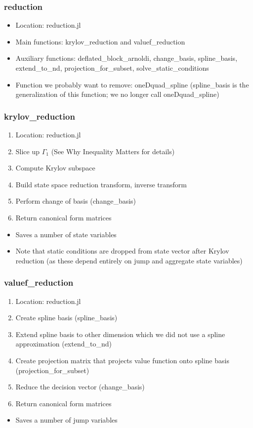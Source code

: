 \documentclass{beamer}
\begin{document}
\begin{frame}
  \frametitle{reduction}
\begin{itemize}
\item Location: reduction.jl
\item Main functions: krylov\_reduction and valuef\_reduction
\item Auxiliary functions: deflated\_block\_arnoldi, change\_basis, spline\_basis, extend\_to\_nd, projection\_for\_subset, solve\_static\_conditions
\item Function we probably want to remove: oneDquad\_spline (spline\_basis is the generalization of this function; we no longer call oneDquad\_spline)
\end{itemize}
\end{frame}
\begin{frame}
\frametitle{krylov\_reduction}
\begin{enumerate}
\item Location: reduction.jl
\item Slice up $\Gamma_1$ (See Why Inequality Matters for details)
\item Compute Krylov subspace
\item Build state space reduction transform, inverse transform
\item Perform change of basis (change\_basis)
\item Return canonical form matrices
\end{enumerate}
\begin{itemize}
\item Saves a number of state variables
\item Note that static conditions are dropped from state vector after Krylov reduction (as these depend entirely on jump and aggregate state variables)
\end{itemize}

\end{frame}
\begin{frame}
  \frametitle{valuef\_reduction}
\begin{enumerate}
\item Location: reduction.jl
\item Create spline basis (spline\_basis)
\item Extend spline basis to other dimension which we did not use a spline approximation (extend\_to\_nd)
\item Create projection matrix that projects value function onto spline basis (projection\_for\_subset)
\item Reduce the decision vector (change\_basis)
\item Return canonical form matrices
\end{enumerate}
\begin{itemize}
\item Saves a number of jump variables
\end{itemize}
\end{frame}
\end{document}
